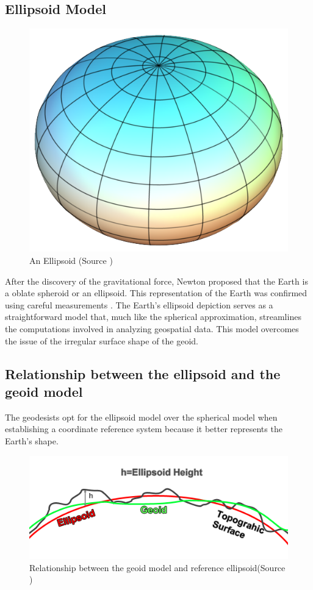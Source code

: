\subsection{Ellipsoid Model}

\begin{figure}[H]
    \centering
    \includegraphics[width=0.4\linewidth]{figures/chapter-2/elipsoid.png}
    \caption{An Ellipsoid (Source \cite{GISGEO_Ellipsoid}) }
    \label{fig:ellipsoid-image}
\end{figure}

After the discovery of the gravitational force, Newton proposed that the Earth is a oblate spheroid or an ellipsoid.
This representation of the Earth was confirmed using careful measurements \cite{Osserman2006-ys}.
The Earth's ellipsoid depiction serves as a straightforward model that, much like the spherical approximation,
streamlines the computations involved in analyzing geospatial data.
This model overcomes the issue of the irregular surface shape of the geoid.

\subsection{Relationship between the ellipsoid and the geoid model}
The geodesists opt for the ellipsoid model over the spherical model when establishing a coordinate reference system because it better represents the Earth's shape.

\begin{figure}[H]
    \centering
    \includegraphics[width=0.6\linewidth]{figures/chapter-2/Ellipsoid-height-relation.png}
    \caption{Relationship between the geoid model and reference ellipsoid(Source \cite{GISGEO_Ellipsoid}) }
    \label{fig:relationship-ellipsoid-geoid-image}
\end{figure}

